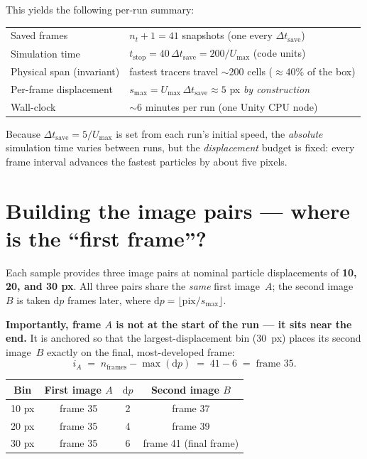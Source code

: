 \documentclass[11pt]{article}
\begin{document}
This yields the following per-run summary:

\begin{center}
\begin{tabular}{ll}
  \toprule
  Saved frames           & $n_t+1 = 41$ snapshots (one every $\Delta t_{\text{save}}$) \\
  Simulation time        & $t_{\text{stop}} = 40\,\Delta t_{\text{save}} = 200/U_{\max}$ (code units) \\
  Physical span (invariant) & fastest tracers travel $\sim$200 cells ($\approx$40\% of the box) \\
  Per-frame displacement & $s_{\max} = U_{\max}\,\Delta t_{\text{save}} \approx 5$ px \emph{by construction} \\
  Wall-clock             & $\sim$6 minutes per run (one Unity CPU node) \\
  \bottomrule
\end{tabular}
\end{center}

\noindent
Because $\Delta t_{\text{save}}=5/U_{\max}$ is set from each run's initial speed,
the \emph{absolute} simulation time varies between runs, but the \emph{displacement}
budget is fixed: every frame interval advances the fastest particles by about five
pixels.

\section{Building the image pairs --- where is the ``first frame''?}
Each sample provides three image pairs at nominal particle displacements of
\textbf{10, 20, and 30 px}. All three pairs share the \emph{same} first image~$A$;
the second image~$B$ is taken $\mathrm{d}p$ frames later, where
$\mathrm{d}p = \lfloor \text{pix}/s_{\max}\rfloor$.

\textbf{Importantly, frame $A$ is not at the start of the run --- it sits near the
end.} It is anchored so that the largest-displacement bin (30~px) places its second
image~$B$ exactly on the final, most-developed frame:
\begin{equation}
  i_A \;=\; n_{\text{frames}} - \max(\mathrm{d}p)\;=\; 41 - 6 \;=\; \text{frame }35 .
\end{equation}

\begin{center}
\begin{tabular}{cccc}
  \toprule
  Bin & First image $A$ & $\mathrm{d}p$ & Second image $B$ \\
  \midrule
  10 px & frame 35 & 2 & frame 37 \\
  20 px & frame 35 & 4 & frame 39 \\
  30 px & frame 35 & 6 & frame 41 \;(final frame) \\
  \bottomrule
\end{tabular}
\end{center}
\end{document}
